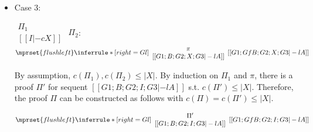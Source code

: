 \begin{itemize}
\item Case 3:
      \begin{center}
        \scriptsize
        \begin{math}
          \begin{array}{c}
            \Pi_1 \\
            {[[I |-c X]]}
          \end{array}
        \end{math}
        \qquad\qquad
        $\Pi_2$:
        \begin{math}
          $$\mprset{flushleft}
          \inferrule* [right={\tiny Gl}] {
            {
              \begin{array}{c}
                \pi \\
                {[[G1; B; G2; X; G3 |-l A]]}
              \end{array}
            }
          }{[[G1; Gf B; G2; X; G3 |-l A]]}
        \end{math}
      \end{center}
      By assumption, $c(\Pi_1),c(\Pi_2)\leq |X|$. By induction on $\Pi_1$
      and $\pi$, there is a proof $\Pi'$ for sequent
      $[[G1; B; G2; I; G3 |-l A]]$ s.t. $c(\Pi') \leq |X|$. Therefore, the
      proof $\Pi$ can be constructed as follows with
      $c(\Pi) = c(\Pi') \leq |X|$.
      \begin{center}
        \scriptsize
        \begin{math}
          $$\mprset{flushleft}
          \inferrule* [right={\tiny Gl}] {
            {
              \begin{array}{c}
                \Pi' \\
                {[[G1; B; G2; I; G3 |-l A]]}
              \end{array}
            }
          }{[[G1; Gf B; G2; I; G3 |-l A]]}
        \end{math}
      \end{center}


\end{itemize}
